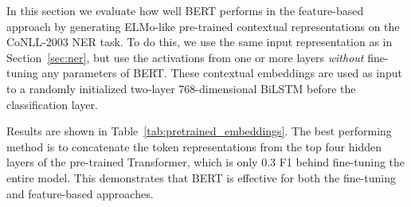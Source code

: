 In this section we evaluate how well BERT performs in the feature-based approach by generating ELMo-like pre-trained contextual representations on the CoNLL-2003 NER task. To do this, we use the same input representation as in Section~\ref{sec:ner}, but use the activations from one or more layers {\it without} fine-tuning any parameters of BERT. These contextual embeddings are used as input to a randomly initialized two-layer 768-dimensional BiLSTM before the classification layer.

Results are shown in Table~\ref{tab:pretrained_embeddings}. The best performing method is to concatenate the token representations from the top four hidden layers of the pre-trained Transformer, which is only 0.3 F1 behind fine-tuning the entire model. This demonstrates that BERT is effective for both the fine-tuning and feature-based approaches.
